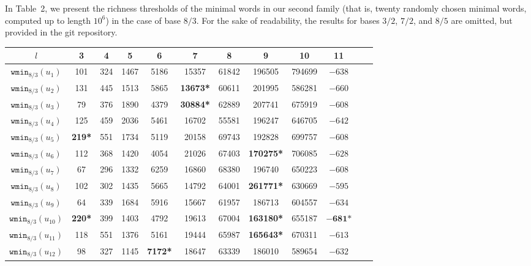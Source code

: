 \documentclass{template_arxiv}
\numberwithin{equation}{section}
\newcommand{\wmin}{\mathtt{wmin}}
\begin{document}
\bigskip

In Table~2, we present the richness thresholds of the minimal words in our second family (that is, twenty randomly chosen minimal words, computed up to length $10^6$) in the case of base $8/3$. For the sake of readability, the results for bases $3/2$, $7/2$, and $8/5$ are omitted, but provided in the git repository.




\begin{center}
	{\small
		\begin{tabular}{|c||c|c|c|c|c|c|c|c|c|c|c|}
			\hline
			$l$ & 3 & 4 & 5 & 6 & 7 & 8 & 9 & 10 & 11 \\
			\hline \hline
			$\wmin_{8/3}(u_1)$ & 101 & 324 & 1467 & 5186 & 15357 & 61842 & 196505 & 794699 & $-638$\\
			\hline
			$\wmin_{8/3}(u_2)$  & 131 & 445 & 1513 & 5865 & \textbf{13673*} & 60611 & 201995 & 586281 & $-660$\\
			\hline
			$\wmin_{8/3}(u_3)$  & 79 & 376 & 1890 & 4379 & \textbf{30884*} & 62889 & 207741 & 675919 & $-608$\\
			\hline
			$\wmin_{8/3}(u_4)$  & 125 & 459 & 2036 & 5461 & 16702 & 55581 & 196247 & 646705 & $-642$\\
			\hline
			$\wmin_{8/3}(u_5)$  & \textbf{219*} & 551 & 1734 & 5119 & 20158 & 69743 & 192828 & 699757 & $-608$\\
			\hline
			$\wmin_{8/3}(u_6)$  & 112 & 368 & 1420 & 4054 & 21026 & 67403 & \textbf{170275*} & 706085 & $-628$\\
			\hline
			$\wmin_{8/3}(u_7)$  & 67 & 296 & 1332 & 6259 & 16860 & 68380 & 196740 & 650223 & $-608$\\
			\hline
			$\wmin_{8/3}(u_8)$  & 102 & 302 & 1435 & 5665 & 14792 & 64001 & \textbf{261771*}& 630669 & $-595$\\
			\hline
			$\wmin_{8/3}(u_9)$  & 64 & 339 & 1684 & 5916 & 15667 & 61957 & 186713 & 604557 & $-634$\\
			\hline
			$\wmin_{8/3}(u_{10})$  & \textbf{220*} & 399 & 1403 & 4792 & 19613 & 67004 & \textbf{163180*} & 655187 & $\mathbf{-681}\textbf{*}$\\
			\hline
			$\wmin_{8/3}(u_{11})$  & 118 & 551 & 1376 & 5161 & 19444 & 65987 & \textbf{165643*} & 670311 & $-613$\\
			\hline
			$\wmin_{8/3}(u_{12})$  & 98 & 327 & 1145 & \textbf{7172*} & 18647 & 63339 & 186010 & 589654 & $-632$\\

\end{tabular}}
\end{center}
\end{document}
